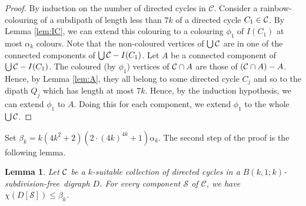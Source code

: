 \documentclass[utf8,10pt]{article}
\theoremstyle{plain}
\newtheorem{lemma}[theorem]{Lemma}
\theoremstyle{definition}
\theoremstyle{remark}
\newcommand{\free}{subdivision-free}
\begin{document}
\begin{proof}
By induction on the number of directed cycles in $\mathcal{C}$.
Consider a rainbow-colouring of a subdipath of length less than $7k$ of a directed cycle $C_1\in {\cal C}$.
By Lemma \ref{lem:IC}, we can extend this colouring to a colouring $\phi_1$ of $I(C_1)$ at most $\alpha_k$ colours.
Note that the non-coloured vertices of $\bigcup{\cal C}$ are in one of the connected components of $\bigcup{\cal C} - I(C_1)$.
Let $A$ be a connected component of $\bigcup{\cal C} - I(C_1)$. The coloured (by $\phi_1$) vertices of ${\cal C}\cap A$ are those of $({\cal C}\cap A)-A$. Hence, by Lemma \ref{lem:A}, they all belong to some directed cycle $C_j$ and so to the dipath $Q_j$ which has length at most $7k$.
Hence, by the induction hypothesis, we can extend $\phi_1$ to $A$. Doing this for each component, we extend $\phi_1$ to the whole $\bigcup{\cal C}$.
\end{proof}



Set $\beta_k= k(4k^2+2)(2\cdot (4k)^{4k} + 1) \alpha_k$.
The second step of the proof is the following lemma.

\begin{lemma}\label{lem:DC}
Let ${\cal C}$ be a $k$-suitable collection of directed cycles in a $B(k,1;k)$-\free\ digraph $D$.
For every component $\mathcal{S}$ of $\mathcal{C}$, we have $\chi(D[\mathcal{S}]) \leq \beta_k$.
\end{lemma}
\end{document}
